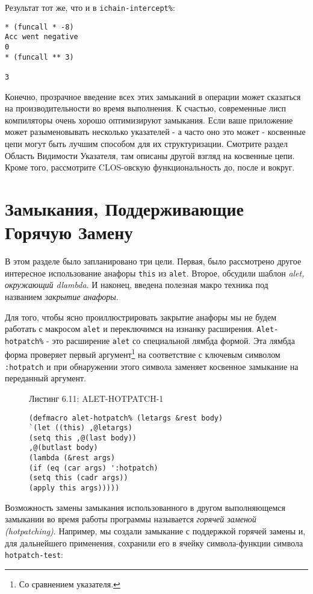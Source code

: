 Результат тот же, что и в \verb"ichain-intercept%":

\begin{verbatim}
* (funcall * -8)
Acc went negative
0
* (funcall ** 3)

3
\end{verbatim}

Конечно, прозрачное введение всех этих замыканий в операции может сказаться на производительности во время выполнения. К счастью, современные лисп компиляторы очень хорошо оптимизируют замыкания. Если ваше приложение может разыменовывать несколько указателей - а часто оно это может - косвенные цепи могут быть лучшим способом для их структуризации. Смотрите раздел Область Видимости Указателя, там описаны другой взгляд на косвенные цепи. Кроме того, рассмотрите CLOS-овскую функциональность до, после и вокруг.

\section{Замыкания, Поддерживающие Горячую Замену}\label{section_hotpatching_closures}


В этом разделе было запланировано три цели. Первая, было рассмотрено другое интересное использование анафоры \verb"this" из \verb"alet". Второе, обсудили шаблон \emph{alet, окружающий dlambda}. И наконец, введена полезная макро техника под названием \emph{закрытие анафоры}.

Для того, чтобы ясно проиллюстрировать закрытие анафоры мы не будем работать с макросом \verb"alet" и переключимся на изнанку расширения. \verb"Alet-hotpatch%" - это расширение \verb"alet" со специальной лямбда формой. Эта лямбда форма проверяет первый аргумент\footnote{Со сравнением указателя.} на соответствие с ключевым символом \verb":hotpatch" и при обнаружении этого символа заменяет косвенное замыкание на переданный аргумент.



\begin{figure}Листинг 6.11: ALET-HOTPATCH-1\label{listing_6.11}
\listbegin
\begin{verbatim}
(defmacro alet-hotpatch% (letargs &rest body)
`(let ((this) ,@letargs)
(setq this ,@(last body))
,@(butlast body)
(lambda (&rest args)
(if (eq (car args) ':hotpatch)
(setq this (cadr args))
(apply this args)))))
\end{verbatim}
\listend
\end{figure}

Возможность замены замыкания использованного в другом выполняющемся замыкании во время работы программы называется \emph{горячей заменой (hotpatching)}. Например, мы создали замыкание с поддержкой горячей замены и, для дальнейшего применения, сохранили его в ячейку символа-функции символа \verb"hotpatch-test":

